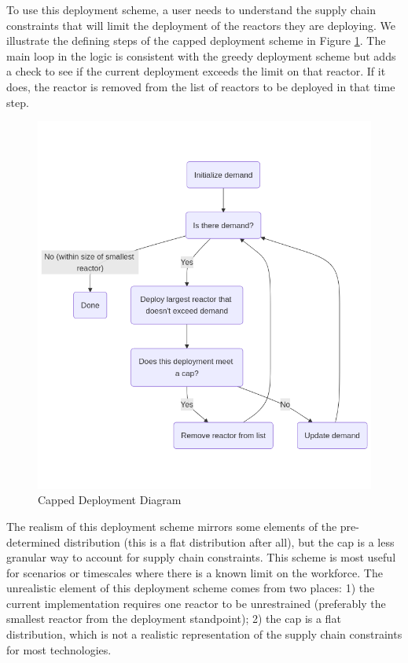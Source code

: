 To use this deployment scheme, a user needs to understand the supply chain
constraints that will limit the deployment of the reactors they are deploying.
We illustrate the defining steps of the capped deployment scheme in Figure
\ref{fig:cap_diagram}. The main loop in the logic is consistent with the greedy
deployment scheme but adds a check to see if the current deployment exceeds the
limit on that reactor. If it does, the reactor is removed from the list of
reactors to be deployed in that time step.

\begin{figure}[!htbp]
    \centering
    \includegraphics[scale=0.4]{images/schemes/cap_diagram.png}
    \caption{Capped Deployment Diagram}
    \label{fig:cap_diagram}
\end{figure}

The realism of this deployment scheme mirrors some elements of the
pre-determined distribution (this is a flat distribution after all), but the
cap is a less granular way to account for supply chain constraints. This scheme
is most useful for scenarios or timescales where there is a known limit on the
workforce. The unrealistic element of this deployment scheme comes from two
places: 1) the current implementation requires one reactor to be unrestrained
(preferably the smallest reactor from the deployment standpoint); 2) the cap is
a flat distribution, which is not a realistic representation of the supply
chain constraints for most technologies.

